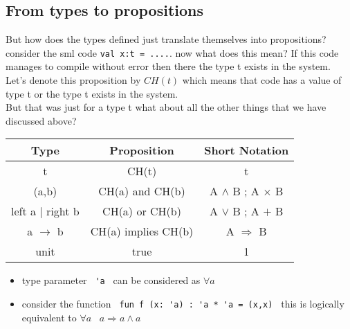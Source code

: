 \documentclass{article}
\begin{document}
\subsection{From types to propositions}
But how does the types defined just translate themselves into propositions?\\
consider the sml code \verb|val x:t = ....|. now what does this mean? If this code manages to compile without error then
there the type t exists in the system.\\
Let's denote this proposition by $CH \left( t \right) $ which means that code has a value of type t or the type t exists in the
system.\\
But that was just for a type t what about all the other things that we have discussed above?

\begingroup
\setlength{\tabcolsep}{10pt} %
\renewcommand{\arraystretch}{1.5} %
\begin{tabular}{c c c}
  Type & Proposition & Short Notation \\
  \hline
  t   & CH(t) & t \\
  \hline
  (a,b) & CH(a) and CH(b) & A $\wedge$ B ; A $\times$ B\\
  \hline
  left a $\mid$ right b & CH(a) or CH(b) & A $\vee$ B ; A $+$ B\\
  \hline
  a $\to$ b & CH(a) implies CH(b) & A $\Longrightarrow$ B\\
  \hline
  unit & true & 1
\end{tabular}
\endgroup                

\begin{itemize}
\item type parameter \verb| 'a | can be considered as $ \forall a $
\item consider the function \verb| fun f (x: 'a) : 'a * 'a = (x,x) |
  this is logically equivalent to $ \forall a \; \; \; a \Longrightarrow a \wedge a $
   
\end{itemize}
\end{document}
